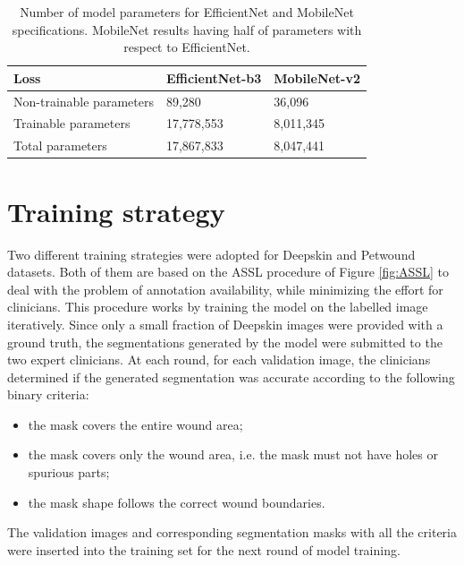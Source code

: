 \documentclass[../main.tex]{subfiles}
\begin{document}
\begin{table}[H]
    \centering
    \begin{tabular}{l|l|l|}
    
         Loss & EfficientNet-b3 & MobileNet-v2 \\ \hline
        Non-trainable parameters & 89,280 & 36,096 \\ \hline
        Trainable parameters & 17,778,553 & 8,011,345 \\ \hline
        Total parameters & 17,867,833 & 8,047,441 \\ \hline
    \end{tabular}
    \caption{Number of model parameters for EfficientNet and MobileNet specifications.  MobileNet results having half of parameters with respect to EfficientNet.}
    \label{tab:models-parameters}
\end{table}

\section{Training strategy}
Two different training strategies were adopted for Deepskin and Petwound datasets. 
Both of them are based on the ASSL procedure of Figure \ref{fig:ASSL} to deal with the problem of annotation availability, while minimizing the effort for clinicians. 
This procedure works by training the model on the labelled image iteratively.
Since only a small fraction of Deepskin images were provided with a ground truth, the segmentations generated by the model were submitted to the two expert clinicians. 
At each round, for each validation image, the clinicians determined if the generated segmentation was accurate according to the following binary criteria:
\begin{itemize}
    \item  the mask covers the entire wound area;
    \item the mask covers only the wound area, i.e. the mask must not have holes or spurious parts;
    \item the mask shape follows the correct wound boundaries.
\end{itemize}
The validation images and corresponding segmentation masks with all the criteria were inserted into the training set for the next round of model training.
\end{document}
